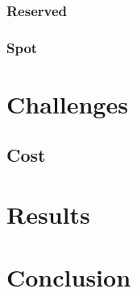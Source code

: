\documentclass{article}
\begin{document}
\subsubsection{Reserved}
\subsubsection{Spot}
\section{Challenges}
\subsection{Cost}
\section{Results}
\section{Conclusion}



\end{document}
